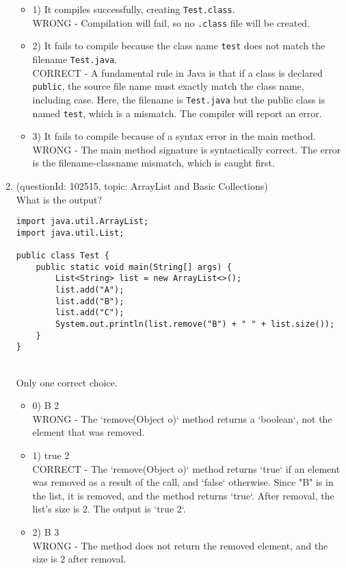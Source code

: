\documentclass[12pt]{article}
\begin{document}
\begin{enumerate}[label=(\arabic*)]
\begin{itemize}
\item 1) It compiles successfully, creating \verb|Test.class|.
 \\ 
WRONG - Compilation will fail, so no \verb|.class| file will be created.

\item 2) It fails to compile because the class name \verb|test| does not match the filename \verb|Test.java|.
 \\ 
CORRECT - A fundamental rule in Java is that if a class is declared \verb|public|, the source file name must exactly match the class name, including case. Here, the filename is \verb|Test.java| but the public class is named \verb|test|, which is a mismatch. The compiler will report an error.

\item 3) It fails to compile because of a syntax error in the main method.
 \\ 
WRONG - The main method signature is syntactically correct. The error is the filename-classname mismatch, which is caught first.

\end{itemize}
\item (questionId: 102515, topic: ArrayList and Basic Collections) \\ 
What is the output?\begin{verbatim}
import java.util.ArrayList;
import java.util.List;

public class Test {
    public static void main(String[] args) {
        List<String> list = new ArrayList<>();
        list.add("A");
        list.add("B");
        list.add("C");
        System.out.println(list.remove("B") + " " + list.size());
    }
}
\end{verbatim}
\\ \noindent Only one correct choice. 
\begin{itemize}
\item 0) B 2
 \\ 
WRONG - The `remove(Object o)` method returns a `boolean`, not the element that was removed.

\item 1) true 2
 \\ 
CORRECT - The `remove(Object o)` method returns `true` if an element was removed as a result of the call, and `false` otherwise. Since "B" is in the list, it is removed, and the method returns `true`. After removal, the list's size is 2. The output is `true 2`.

\item 2) B 3
 \\ 
WRONG - The method does not return the removed element, and the size is 2 after removal.


\end{itemize}
\end{enumerate}
\end{document}
